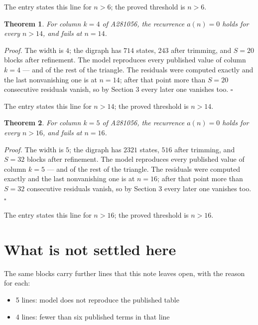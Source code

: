 \documentclass[11pt]{article}
\newtheorem{theorem}{Theorem}
\theoremstyle{definition}
\begin{document}
The entry states this line for $n > 6$; the proved threshold is $n > 6$.

\begin{theorem} For column $k = 4$ of A281056, the recurrence $a(n) = 0$ holds for every $n > 14$, and fails at $n = 14$.\end{theorem}

{\itshape Proof.} The width is $4$; the digraph has $714$ states, $243$ after trimming, and $S = 20$ blocks after refinement. The model reproduces every published value of column $k = 4$ --- and of the rest of the triangle. The residuals were computed exactly and the last nonvanishing one is at $n = 14$; after that point more than $S = 20$ consecutive residuals vanish, so by Section 3 every later one vanishes too. $\square$

The entry states this line for $n > 14$; the proved threshold is $n > 14$.

\begin{theorem} For column $k = 5$ of A281056, the recurrence $a(n) = 0$ holds for every $n > 16$, and fails at $n = 16$.\end{theorem}

{\itshape Proof.} The width is $5$; the digraph has $2321$ states, $516$ after trimming, and $S = 32$ blocks after refinement. The model reproduces every published value of column $k = 5$ --- and of the rest of the triangle. The residuals were computed exactly and the last nonvanishing one is at $n = 16$; after that point more than $S = 32$ consecutive residuals vanish, so by Section 3 every later one vanishes too. $\square$

The entry states this line for $n > 16$; the proved threshold is $n > 16$.

\section{What is not settled here}

The same blocks carry further lines that this note leaves open, with the reason for each:

\begin{itemize}

\item 5 lines: model does not reproduce the published table

\item 4 lines: fewer than six published terms in that line

\end{itemize}
\end{document}
